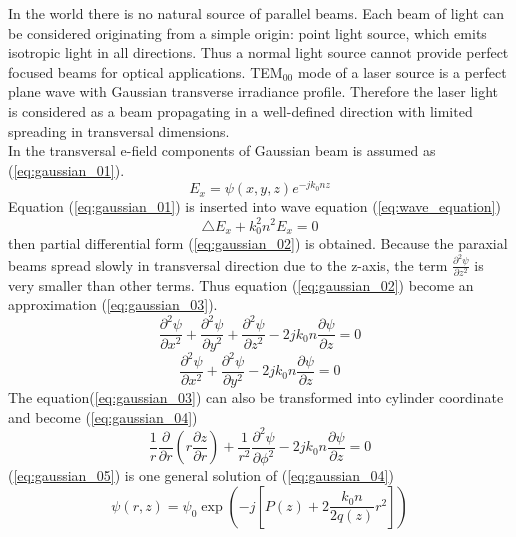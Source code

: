 In the world there is no natural source of parallel beams. Each beam of light can be considered originating from a simple origin: point light source, which emits isotropic light in all directions. Thus a normal light source cannot provide perfect focused beams for optical applications. TEM$_{00}$ mode of a laser source is a perfect plane wave with Gaussian transverse irradiance profile\cite{CVI_Melles_Griot_Technical_Guide}. Therefore the laser light is considered as a beam propagating in a well-defined direction with limited spreading in transversal dimensions.\\ 
In \cite{ script_FT_TET} the transversal e-field components of Gaussian beam is assumed as (\ref{eq:gaussian_01}).
\begin{equation}
E_{x}=\psi(x,y,z)e^{-jk_{0}nz}
\label{eq:gaussian_01}
\end{equation}
Equation (\ref{eq:gaussian_01}) is inserted into wave equation (\ref{eq:wave_equation})
\begin{equation}
\bigtriangleup E_{x}+k^{2}_{0}n^{2}E_{x}=0
\label{eq:wave_equation}
\end{equation}
 then partial differential form (\ref{eq:gaussian_02}) is obtained. Because the paraxial beams spread slowly in transversal direction due to the z-axis, the term $\frac{\partial ^{2}\psi}{\partial z^2}$ is very smaller than other terms. Thus equation (\ref{eq:gaussian_02}) become an approximation (\ref{eq:gaussian_03}).
\begin{equation}
\frac{\partial ^{2}\psi}{\partial x^2}+\frac{\partial ^{2}\psi}{\partial y^2}+\frac{ \partial ^{2}\psi}{\partial z^2}-2jk_{0}n\frac{\partial\psi}{\partial z}=0
\label{eq:gaussian_02}
\end{equation}
\begin{equation}
\frac{ \partial ^{2}\psi}{\partial x^2}+\frac{\partial ^{2}\psi}{\partial y^2}-2jk_{0}n\frac{\partial\psi}{\partial z}=0
\label{eq:gaussian_03}
\end{equation}
The equation(\ref{eq:gaussian_03}) can also be transformed into cylinder coordinate and become (\ref{eq:gaussian_04})
\begin{equation}
\frac{1}{r}\frac{\partial}{\partial r}\left(r\frac{\partial z}{\partial r}\right)+\frac{1}{r^2}\frac{ \partial ^{2}\psi}{\partial \phi^2}-2jk_{0}n\frac{\partial\psi}{\partial z}=0
\label{eq:gaussian_04}
\end{equation}
(\ref{eq:gaussian_05}) is one general solution of (\ref{eq:gaussian_04})
\begin{equation}
\psi(r,z)=\psi_{0}\exp\left(-j\left[P(z)+2 \frac{ k_{0}n}{2q(z)}r^2\right]\right)
\label{eq:gaussian_05}
\end{equation}
